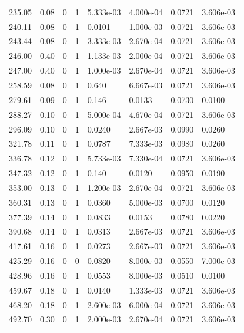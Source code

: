 \documentclass[preview]{standalone}
\begin{document}
{{\begin{tabular}{L{1.2cm}C{1.2cm} C{0.3cm}C{0.5cm} C{1.4cm}C{1.4cm} C{1.4cm}C{1.4cm}}
  235.05  &  0.08  & 0     &  1 &  5.333e-03  & 4.000e-04  & 0.0721 &  3.606e-03   \\ 
  240.11  &  0.08  & 0     &  1 &  0.0101  & 1.000e-03  & 0.0721 &  3.606e-03   \\ 
  243.44  &  0.08  & 0     &  1 &  3.333e-03  & 2.670e-04  & 0.0721 &  3.606e-03   \\ 
  246.00  &  0.40  & 0     &  1 &  1.133e-03  & 2.000e-04  & 0.0721 &  3.606e-03   \\ 
  247.00  &  0.40  & 0     &  1 &  1.000e-03  & 2.670e-04  & 0.0721 &  3.606e-03   \\ 
  258.59  &  0.08  & 0     &  1 &  0.640  & 6.667e-03  & 0.0721 &  3.606e-03   \\ 
  279.61  &  0.09  & 0     &  1 &  0.146  & 0.0133  & 0.0730 &  0.0100   \\ 
  288.27  &  0.10  & 0     &  1 &  5.000e-04  & 4.670e-04  & 0.0721 &  3.606e-03   \\ 
  296.09  &  0.10  & 0     &  1 &  0.0240  & 2.667e-03  & 0.0990 &  0.0260   \\ 
  321.78  &  0.11  & 0     &  1 &  0.0787  & 7.333e-03  & 0.0980 &  0.0260   \\ 
  336.78  &  0.12  & 0     &  1 &  5.733e-03  & 7.330e-04  & 0.0721 &  3.606e-03   \\ 
  347.32  &  0.12  & 0     &  1 &  0.140  & 0.0120  & 0.0950 &  0.0190   \\ 
  353.00  &  0.13  & 0     &  1 &  1.200e-03  & 2.670e-04  & 0.0721 &  3.606e-03   \\ 
  360.31  &  0.13  & 0     &  1 &  0.0360  & 5.000e-03  & 0.0700 &  0.0120   \\ 
  377.39  &  0.14  & 0     &  1 &  0.0833  & 0.0153  & 0.0780 &  0.0220   \\ 
  390.68  &  0.14  & 0     &  1 &  0.0313  & 2.667e-03  & 0.0721 &  3.606e-03   \\ 
  417.61  &  0.16  & 0     &  1 &  0.0273  & 2.667e-03  & 0.0721 &  3.606e-03   \\ 
  425.29  &  0.16  & 0     &  0 &  0.0820  & 8.000e-03  & 0.0550 &  7.000e-03   \\ 
  428.96  &  0.16  & 0     &  1 &  0.0553  & 8.000e-03  & 0.0510 &  0.0100   \\ 
  459.67  &  0.18  & 0     &  1 &  0.0140  & 1.333e-03  & 0.0721 &  3.606e-03   \\ 
  468.20  &  0.18  & 0     &  1 &  2.600e-03  & 6.000e-04  & 0.0721 &  3.606e-03   \\ 
  492.70  &  0.30  & 0     &  1 &  2.000e-03  & 2.670e-04  & 0.0721 &  3.606e-03   \\ 

\end{tabular}}}
\end{document}
